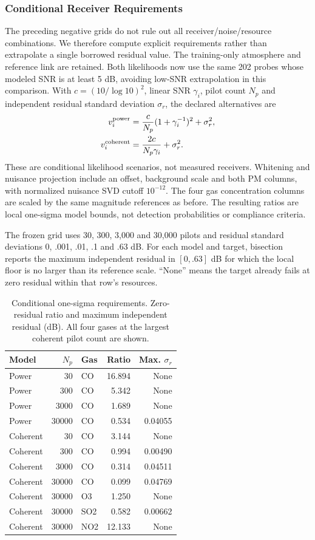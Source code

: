 \documentclass[conference]{IEEEtran}
\begin{document}
\subsubsection{Conditional Receiver Requirements}
The preceding negative grids do not rule out all receiver/noise/resource combinations. We therefore compute explicit requirements rather than extrapolate a single borrowed residual value. The training-only atmosphere and reference link are retained. Both likelihoods now use the same 202 probes whose modeled SNR is at least 5 dB, avoiding low-SNR extrapolation in this comparison. With $c=(10/\log 10)^2$, linear SNR $\gamma_i$, pilot count $N_p$ and independent residual standard deviation $\sigma_r$, the declared alternatives are
\begin{align}
v_i^{\rm power}&=\frac{c}{N_p}(1+\gamma_i^{-1})^2+\sigma_r^2,\\
v_i^{\rm coherent}&=\frac{2c}{N_p\gamma_i}+\sigma_r^2.
\end{align}
These are conditional likelihood scenarios, not measured receivers. Whitening and nuisance projection include an offset, background scale and both PM columns, with normalized nuisance SVD cutoff $10^{-12}$. The four gas concentration columns are scaled by the same magnitude references as before. The resulting ratios are local one-sigma model bounds, not detection probabilities or compliance criteria.

The frozen grid uses 30, 300, 3,000 and 30,000 pilots and residual standard deviations 0, .001, .01, .1 and .63 dB. For each model and target, bisection reports the maximum independent residual in $[0,.63]$ dB for which the local floor is no larger than its reference scale. ``None'' means the target already fails at zero residual within that row's resources.
\begin{table}[t]\centering\footnotesize
\caption{Conditional one-sigma requirements. Zero-residual ratio and maximum independent residual (dB). All four gases at the largest coherent pilot count are shown.}
\setlength{\tabcolsep}{3pt}
\begin{tabular}{lrlrr}\toprule
Model & $N_p$ & Gas & Ratio & Max. $\sigma_r$\\\midrule
Power & 30 & CO & 16.894 & None\\
Power & 300 & CO & 5.342 & None\\
Power & 3000 & CO & 1.689 & None\\
Power & 30000 & CO & 0.534 & 0.04055\\
Coherent & 30 & CO & 3.144 & None\\
Coherent & 300 & CO & 0.994 & 0.00490\\
Coherent & 3000 & CO & 0.314 & 0.04511\\
Coherent & 30000 & CO & 0.099 & 0.04769\\
Coherent & 30000 & O3 & 1.250 & None\\
Coherent & 30000 & SO2 & 0.582 & 0.00662\\
Coherent & 30000 & NO2 & 12.133 & None\\
\bottomrule\end{tabular}
\end{table}
\end{document}
